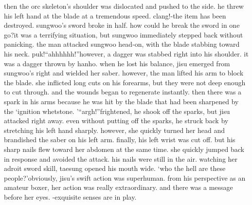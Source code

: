 then the orc skeleton’s shoulder was dislocated and pushed to the side.
 he threw his left hand at the blade at a tremendous speed.
clang!-the item has been destroyed.
sungwoo’s sword broke in half.
 how could he break the sword in one go?it was a terrifying situation, but sungwoo immediately stepped back without panicking.
the man attacked sungwoo head-on, with the blade stabbing toward his neck.
puk!“ahhhhhh!”however, a dagger was stabbed right into his shoulder.
 it was a dagger thrown by hanho.
when he lost his balance, jisu emerged from sungwoo’s right and wielded her saber.
however, the man lifted his arm to block the blade.
 she inflicted long cuts on his forearms, but they were not deep enough to cut through.
 and the wounds began to regenerate instantly.
then there was a spark in his arms because he was hit by the blade that had been sharpened by the ‘ignition whetstone.
’“argh!”frightened, he shook off the sparks, but jisu attacked right away.
 even without putting off the sparks, he struck back by stretching his left hand sharply.
however, she quickly turned her head and brandished the saber on his left arm.
finally, his left wrist was cut off.
 but his sharp nails flew toward her abdomen at the same time.
 she quickly jumped back in response and avoided the attack.
his nails were still in the air.
watching her adroit sword skill, taesung opened his mouth wide.
‘who the hell are these people?’obviously, jisu’s swift action was superhuman.
 from his perspective as an amateur boxer, her action was really extraordinary.
and there was a message before her eyes.
-exquisite senses are in play.


 